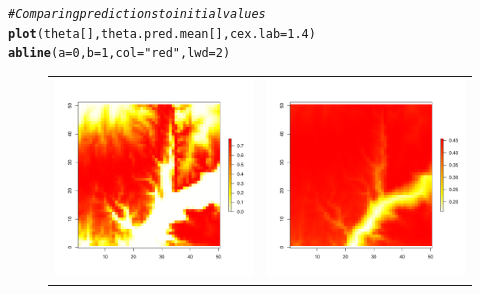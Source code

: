 \documentclass[a4paper, 12pt, leqno]{article}\usepackage[]{graphicx}\usepackage[]{color}
\makeatletter
\newcommand{\hlnum}[1]{\textcolor[rgb]{0.686,0.059,0.569}{#1}}%
\newcommand{\hlstr}[1]{\textcolor[rgb]{0.192,0.494,0.8}{#1}}%
\newcommand{\hlcom}[1]{\textcolor[rgb]{0.678,0.584,0.686}{\textit{#1}}}%
\newcommand{\hlstd}[1]{\textcolor[rgb]{0.345,0.345,0.345}{#1}}%
\newcommand{\hlkwc}[1]{\textcolor[rgb]{0.333,0.667,0.333}{#1}}%
\newcommand{\hlkwd}[1]{\textcolor[rgb]{0.737,0.353,0.396}{\textbf{#1}}}%
\newenvironment{kframe}{%
 \def\at@end@of@kframe{}%
 \ifinner\ifhmode%
  \def\at@end@of@kframe{\end{minipage}}%
  \begin{minipage}{\columnwidth}%
 \fi\fi%
 \def\FrameCommand##1{\hskip\@totalleftmargin \hskip-\fboxsep
 \colorbox{shadecolor}{##1}\hskip-\fboxsep
     \hskip-\linewidth \hskip-\@totalleftmargin \hskip\columnwidth}%
 \MakeFramed {\advance\hsize-\width
   \@totalleftmargin\z@ \linewidth\hsize
   \@setminipage}}%
 {\par\unskip\endMakeFramed%
 \at@end@of@kframe}
\newenvironment{knitrout}{}{} %
\makeatother
\begin{document}
\begin{knitrout}\small
{}\color{fgcolor}\begin{kframe}
\begin{alltt}
\hlcom{# Comparing predictions to initial values}
\hlkwd{plot}\hlstd{(theta[],theta.pred.mean[],}\hlkwc{cex.lab}\hlstd{=}\hlnum{1.4}\hlstd{)}
\hlkwd{abline}\hlstd{(}\hlkwc{a}\hlstd{=}\hlnum{0}\hlstd{,}\hlkwc{b}\hlstd{=}\hlnum{1}\hlstd{,}\hlkwc{col}\hlstd{=}\hlstr{"red"}\hlstd{,}\hlkwc{lwd}\hlstd{=}\hlnum{2}\hlstd{)}
\end{alltt}
\end{kframe}
\end{knitrout}



\begin{figure}[!h] 
  \begin{tabular}{cc}
    \includegraphics[width=8cm]{figures/theta-binomial.pdf} &
    \includegraphics[width=8cm]{figures/predictions-siteocc.pdf} \\

\end{tabular}
\end{figure}
\end{document}
